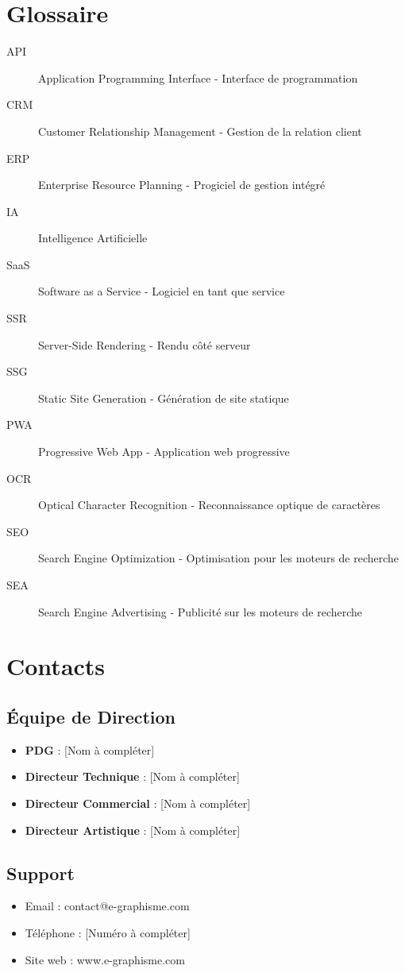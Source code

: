 \documentclass[12pt,a4paper,oneside]{book}
\begin{document}
\chapter{Glossaire}
\begin{description}
\item[API] Application Programming Interface - Interface de programmation
\item[CRM] Customer Relationship Management - Gestion de la relation client
\item[ERP] Enterprise Resource Planning - Progiciel de gestion intégré
\item[IA] Intelligence Artificielle
\item[SaaS] Software as a Service - Logiciel en tant que service
\item[SSR] Server-Side Rendering - Rendu côté serveur
\item[SSG] Static Site Generation - Génération de site statique
\item[PWA] Progressive Web App - Application web progressive
\item[OCR] Optical Character Recognition - Reconnaissance optique de caractères
\item[SEO] Search Engine Optimization - Optimisation pour les moteurs de recherche
\item[SEA] Search Engine Advertising - Publicité sur les moteurs de recherche
\end{description}

\chapter{Contacts}

\section{Équipe de Direction}
\begin{itemize}
\item \textbf{PDG} : [Nom à compléter]
\item \textbf{Directeur Technique} : [Nom à compléter]
\item \textbf{Directeur Commercial} : [Nom à compléter]
\item \textbf{Directeur Artistique} : [Nom à compléter]
\end{itemize}

\section{Support}
\begin{itemize}
\item Email : contact@e-graphisme.com
\item Téléphone : [Numéro à compléter]
\item Site web : www.e-graphisme.com
\end{itemize}
\end{document}
